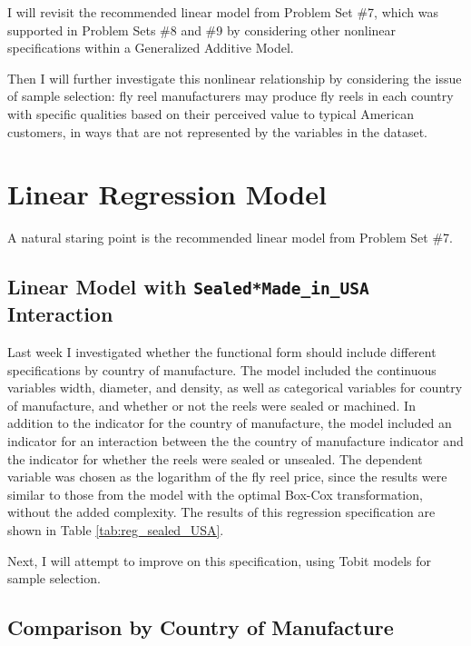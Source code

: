 I will revisit the recommended linear model
from Problem Set \#7, 
which was supported in
Problem Sets \#8 and  \#9 
by considering other nonlinear specifications
within a Generalized Additive Model. 



Then I will further investigate this nonlinear relationship
by considering the issue of sample selection:
fly reel manufacturers 
may produce 
fly reels in each country
with specific qualities based on
their perceived value to typical 
American 
customers, 
in ways that are not represented by the variables in the dataset.



\clearpage
\section{Linear Regression Model}

A natural staring point is the recommended linear model
from Problem Set \#7. 

\subsection{Linear Model with \texttt{Sealed*Made\_in\_USA} Interaction}

Last week I investigated whether 
the functional form should include different specifications by
country of manufacture.
% 
The model included the continuous variables 
width, diameter, and density, 
as well as categorical variables for 
country of manufacture, 
and whether or not the reels were sealed or machined. 
% 
In addition to the indicator for the country of manufacture, the model included an indicator for an interaction between
the the country of manufacture indicator and the indicator for whether the reels were sealed or unsealed. 
% 
The dependent variable was chosen as 
the logarithm of the fly reel price, 
since the results were similar to those from the model 
with the optimal Box-Cox transformation, 
without the added complexity. 
% 
The results of this regression specification are shown in 
Table \ref{tab:reg_sealed_USA}. 
% 

% 
Next, I will attempt to improve on this specification,
using Tobit models for sample selection.





\pagebreak
\subsection{Comparison by Country of Manufacture}

